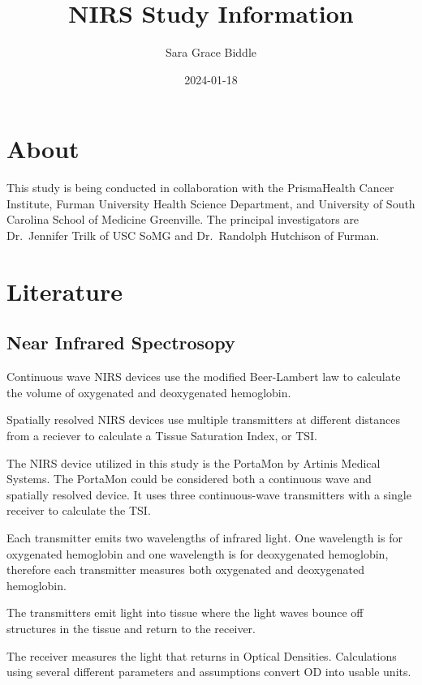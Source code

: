 \documentclass[
]{book}
\title{NIRS Study Information}
\author{Sara Grace Biddle}
\date{2024-01-18}
\begin{document}
\maketitle

{
\setcounter{tocdepth}{1}
\tableofcontents
}
\hypertarget{about}{%
\chapter{About}\label{about}}

This study is being conducted in collaboration with the PrismaHealth Cancer Institute, Furman University Health Science Department, and University of South Carolina School of Medicine Greenville. The principal investigators are Dr.~Jennifer Trilk of USC SoMG and Dr.~Randolph Hutchison of Furman.

\hypertarget{Literature}{%
\chapter{Literature}\label{Literature}}

\hypertarget{Literature-nirs}{%
\section{Near Infrared Spectrosopy}\label{Literature-nirs}}

Continuous wave NIRS devices use the modified Beer-Lambert law to calculate the volume of oxygenated and deoxygenated hemoglobin.

Spatially resolved NIRS devices use multiple transmitters at different distances from a reciever to calculate a Tissue Saturation Index, or TSI.

The NIRS device utilized in this study is the PortaMon by Artinis Medical Systems. The PortaMon could be considered both a continuous wave and spatially resolved device. It uses three continuous-wave transmitters with a single receiver to calculate the TSI.

Each transmitter emits two wavelengths of infrared light. One wavelength is for oxygenated hemoglobin and one wavelength is for deoxygenated hemoglobin, therefore each transmitter measures both oxygenated and deoxygenated hemoglobin.

The transmitters emit light into tissue where the light waves bounce off structures in the tissue and return to the receiver.

The receiver measures the light that returns in Optical Densities. Calculations using several different parameters and assumptions convert OD into usable units.
\end{document}
